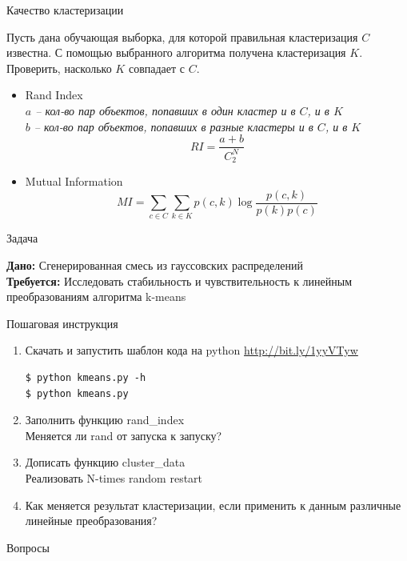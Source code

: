 \documentclass[10pt]{beamer}
\begin{document}
\begin{frame}{Качество кластеризации}

Пусть дана обучающая выборка, для которой правильная кластеризация $C$ известна. С помощью выбранного алгоритма получена кластеризация $K$. Проверить, насколько $K$ совпадает с $C$.

\vspace{1em}
\begin{itemize}
\item Rand Index \\
{\it \small
$a$ -- кол-во пар объектов, попавших в один кластер и в $C$, и в $K$ \\
$b$ -- кол-во пар объектов, попавших в разные кластеры и в $C$, и в $K$
\[
RI = \frac{a+b}{C^N_2}
\]
}
\item Mutual Information \\
{\it \small
\[
MI = \sum_{c \in C} \sum_{k \in K} p(c, k) \log \frac{p(c, k)}{p(k)p(c)}
\]
}
\end{itemize}

\end{frame}

\begin{frame}[fragile]{Задача}

{\bf Дано:} Сгенерированная смесь из гауссовских распределений \\
{\bf Требуется:} Исследовать стабильность и чувствительность к линейным преобразованиям алгоритма k-means

\vspace{1em}
Пошаговая инструкция
\begin{enumerate}
\item Скачать и запустить шаблон кода на python \url{http://bit.ly/1yyVTyw}
\begin{shaded}
{\color{green} \begin{verbatim}
$ python kmeans.py -h
$ python kmeans.py
\end{verbatim}}
\end{shaded}
\item Заполнить функцию \textsf{rand\_index} \\ Меняется ли rand от запуска к запуску?
\item Дописать функцию \textsf{cluster\_data} \\ Реализовать N-times random restart
\item Как меняется результат кластеризации, если применить к данным различные линейные преобразования?
\end{enumerate}

\end{frame}

\begin{frame}[plain]
\begin{center}
{\Large Вопросы}
\end{center}
\end{frame}
\end{document}

